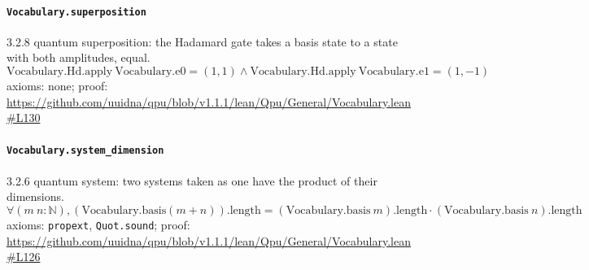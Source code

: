 \documentclass[11pt]{article}
\begin{document}
\paragraph{\texttt{Vocabulary.superposition}}
3.2.8 quantum superposition: the Hadamard gate takes a basis state to a state with both amplitudes, equal.
\[ \mathrm{Vocabulary.Hd.apply}\ \mathrm{Vocabulary.e0} = (1, 1) \land \mathrm{Vocabulary.Hd.apply}\ \mathrm{Vocabulary.e1} = (1, -1) \]
\noindent axioms: none; proof: \url{https://github.com/uuidna/qpu/blob/v1.1.1/lean/Qpu/General/Vocabulary.lean\#L130}

\paragraph{\texttt{Vocabulary.system\_dimension}}
3.2.6 quantum system: two systems taken as one have the product of their dimensions.
\[ \forall (m\ n : \mathbb{N}), (\mathrm{Vocabulary.basis} (m + n))\mathrm{.length} = (\mathrm{Vocabulary.basis}\ m)\mathrm{.length} \cdot (\mathrm{Vocabulary.basis}\ n)\mathrm{.length} \]
\noindent axioms: \texttt{propext}, \texttt{Quot.sound}; proof: \url{https://github.com/uuidna/qpu/blob/v1.1.1/lean/Qpu/General/Vocabulary.lean\#L126}
\end{document}
